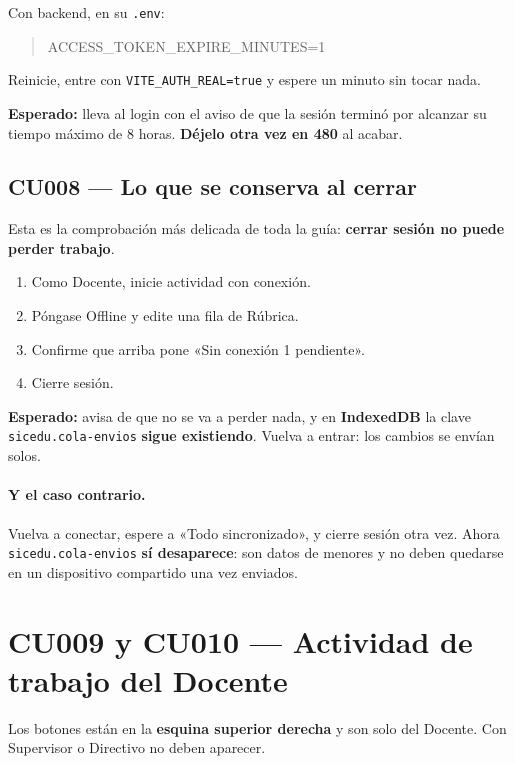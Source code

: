 \documentclass[11pt,a4paper]{article}
\begin{document}
Con backend, en su \texttt{.env}:

\begin{quote}\ttfamily
ACCESS\_TOKEN\_EXPIRE\_MINUTES=1
\end{quote}

Reinicie, entre con \texttt{VITE\_AUTH\_REAL=true} y espere un minuto sin tocar
nada.

\textbf{Esperado:} lleva al login con el aviso de que la sesión terminó por
alcanzar su tiempo máximo de 8 horas. \textbf{Déjelo otra vez en 480} al acabar.

\subsection{CU008 --- Lo que se conserva al cerrar}

Esta es la comprobación más delicada de toda la guía: \textbf{cerrar sesión no
puede perder trabajo}.

\begin{enumerate}
  \item Como Docente, inicie actividad con conexión.
  \item Póngase Offline y edite una fila de Rúbrica.
  \item Confirme que arriba pone «Sin conexión \textperiodcentered{} 1 pendiente».
  \item Cierre sesión.
\end{enumerate}

\textbf{Esperado:} avisa de que no se va a perder nada, y en \textbf{IndexedDB}
la clave \texttt{sicedu.cola-envios} \textbf{sigue existiendo}. Vuelva a entrar:
los cambios se envían solos.

\paragraph{Y el caso contrario.} Vuelva a conectar, espere a «Todo
sincronizado», y cierre sesión otra vez. Ahora \texttt{sicedu.cola-envios}
\textbf{sí desaparece}: son datos de menores y no deben quedarse en un
dispositivo compartido una vez enviados.

\newpage
\section{CU009 y CU010 --- Actividad de trabajo del Docente}

Los botones están en la \textbf{esquina superior derecha} y son solo del
Docente. Con Supervisor o Directivo no deben aparecer.
\end{document}
